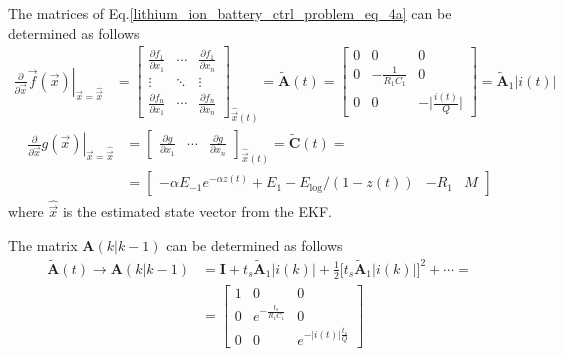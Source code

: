 \documentclass[11pt,a4paper,oneside]{book}
\numberwithin{equation}{section}
\newcommand{\abs}[1]{\big|#1\big|}
\theoremstyle{it}
\theoremstyle{definition}
\begin{document}
\vspace{5mm}
The matrices of Eq.\eqref{lithium_ion_battery_ctrl_problem_eq_4a} can be determined as follows 
\begin{equation}\label{lithium_ion_battery_ctrl_problem_eq_6}
	\begin{aligned}
		\left.\frac{\partial}{\partial 
			\vec{x}}\vec{f}(\vec{x})\right|_{\vec{x}=\hat{\vec{x}}} &= 
		\begin{bmatrix} \frac{\partial f_1}{\partial x_1} & \cdots & 
			\frac{\partial f_1}{\partial x_n} \\[6pt]
			\vdots & \ddots & \vdots \\[6pt]
			\frac{\partial f_n}{\partial x_1} & \cdots & \frac{\partial 
				f_n}{\partial x_n}
		\end{bmatrix}_{\hat{\vec{x}}(t)} = \tilde{\mathbf{A}}(t) = \begin{bmatrix}
			0&0&0 \\[6pt] 0&-\frac{1}{R_1C_1}&0 \\[6pt] 0&0&-\abs{\frac{i(t)}{Q}}
		\end{bmatrix} = \tilde{\mathbf{A}}_1\abs{i(t)}
	\end{aligned}
\end{equation} 
\begin{equation}\label{lithium_ion_battery_ctrl_problem_eq_7}
	\begin{aligned}
		\left.\frac{\partial}{\partial 
			\vec{x}}{g}(\vec{x})\right|_{\vec{x}=\hat{\vec{x}}} &= 
		\begin{bmatrix} \frac{\partial g}{\partial x_1} & \cdots & 
			\frac{\partial g}{\partial x_n}
		\end{bmatrix}_{\hat{\vec{x}}(t)} = \tilde{\mathbf{C}}(t) =  \\[6pt]
		&=\begin{bmatrix}
			-\alpha E_{-1}e^{-\alpha z(t)}+E_1-E_\text{log}/(1-z(t)) & -R_1 & M
		\end{bmatrix}
	\end{aligned}
\end{equation} 
where $\hat{\vec{x}}$ is the estimated state vector from the EKF. 

\vspace{5mm}
The matrix $\mathbf{A}(k|k-1)$ can be determined as follows
\begin{equation}
	\begin{aligned}
		\tilde{\mathbf{A}}(t) \rightarrow \mathbf{A}(k|k-1) &= 
		\mathbf{I}+t_s\tilde{\mathbf{A}}_1\abs{i(k)}+
		\frac{1}{2}\Big[t_s\tilde{\mathbf{A}}_1\abs{i(k)}\Big]^2+\cdots 
		=\\[6pt] 
		&= \begin{bmatrix} 	1&0&0 \\[6pt] 0&e^{-\frac{t_s}{R_1C_1}}&0 \\[6pt] 0&0&e^{-\abs{i(t)}\frac{t_s}{Q}}\end{bmatrix}
	\end{aligned}
\end{equation}
\end{document}
